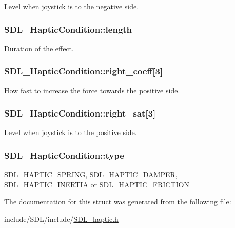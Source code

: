 Level when joystick is to the negative side. \hypertarget{struct_s_d_l___haptic_condition_ad0efb0a6ddc20f058e87199eaaa95978}{
\subsubsection[{length}]{ S\-D\-L\-\_\-\-Haptic\-Condition\-::length}}\label{struct_s_d_l___haptic_condition_ad0efb0a6ddc20f058e87199eaaa95978}
Duration of the effect. \hypertarget{struct_s_d_l___haptic_condition_a3de7f164ef88841255535387d0f100b6}{
\subsubsection[{right\-\_\-coeff}]{ S\-D\-L\-\_\-\-Haptic\-Condition\-::right\-\_\-coeff\mbox{[}3\mbox{]}}}\label{struct_s_d_l___haptic_condition_a3de7f164ef88841255535387d0f100b6}
How fast to increase the force towards the positive side. \hypertarget{struct_s_d_l___haptic_condition_a90427a1e0d464b4b53abc1d419c97b2e}{
\subsubsection[{right\-\_\-sat}]{ S\-D\-L\-\_\-\-Haptic\-Condition\-::right\-\_\-sat\mbox{[}3\mbox{]}}}\label{struct_s_d_l___haptic_condition_a90427a1e0d464b4b53abc1d419c97b2e}
Level when joystick is to the positive side. \hypertarget{struct_s_d_l___haptic_condition_a7be55a9a86c05dd1a54a3006781cfa6f}{
\subsubsection[{type}]{ S\-D\-L\-\_\-\-Haptic\-Condition\-::type}}\label{struct_s_d_l___haptic_condition_a7be55a9a86c05dd1a54a3006781cfa6f}
\hyperlink{_s_d_l__haptic_8h_a3b52d4700380085e2b5d87bb20320fb1}{S\-D\-L\-\_\-\-H\-A\-P\-T\-I\-C\-\_\-\-S\-P\-R\-I\-N\-G}, \hyperlink{_s_d_l__haptic_8h_a69522f261973e3ea4273486141320a87}{S\-D\-L\-\_\-\-H\-A\-P\-T\-I\-C\-\_\-\-D\-A\-M\-P\-E\-R}, \hyperlink{_s_d_l__haptic_8h_a14b807471589120395aec28293cf6642}{S\-D\-L\-\_\-\-H\-A\-P\-T\-I\-C\-\_\-\-I\-N\-E\-R\-T\-I\-A} or \hyperlink{_s_d_l__haptic_8h_a98a5011311168d63921aaac21403a4d8}{S\-D\-L\-\_\-\-H\-A\-P\-T\-I\-C\-\_\-\-F\-R\-I\-C\-T\-I\-O\-N} 

The documentation for this struct was generated from the following file\-:\begin{DoxyCompactItemize}
\item 
include/\-S\-D\-L/include/\hyperlink{_s_d_l__haptic_8h}{S\-D\-L\-\_\-haptic.\-h}\end{DoxyCompactItemize}
